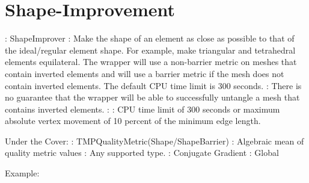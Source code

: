 \newpage

\section{Shape-Improvement} \label{sec:ShapeImprover}

: ShapeImprover \newline
{}: Make the shape of an element as close as possible to
that of the ideal/regular element shape. For example, make triangular and
tetrahedral elements equilateral.  The wrapper will use a non-barrier metric on meshes that contain inverted elements
and will use a barrier metric if the mesh does not contain inverted elements.  The default CPU time limit is 300 seconds.\newline
{}: There is no guarantee that the wrapper will be able to successfully untangle a mesh that contains inverted elements.\newline
{}:  \newline
{}: CPU time limit of 300 seconds or maximum absolute vertex movement of 10 percent of the minimum edge length. \newline \newline

\noindent Under the Cover: \newline
{}: TMPQualityMetric(Shape/ShapeBarrier) \newline
{}: Algebraic mean of quality metric values \newline
{}: Any supported type. \newline
{}: Conjugate Gradient \newline
{}: Global \newline

\noindent Example: \newline

